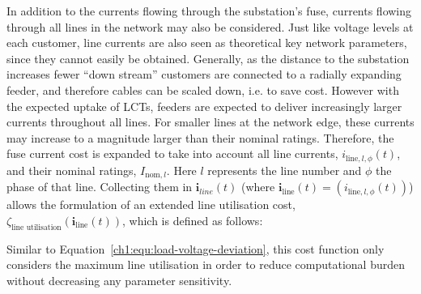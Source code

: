In addition to the currents flowing through the substation's fuse, currents flowing through all lines in the network may also be considered.
Just like voltage levels at each customer, line currents are also seen as theoretical key network parameters, since they cannot easily be obtained.
Generally, as the distance to the substation increases fewer ``down stream'' customers are connected to a radially expanding feeder, and therefore cables can be scaled down, i.e. to save cost.
However with the expected uptake of LCTs, feeders are expected to deliver increasingly larger currents throughout all lines.
For smaller lines at the network edge, these currents may increase to a magnitude larger than their nominal ratings.
Therefore, the fuse current cost is expanded to take into account all line currents, $i_{\text{line},l,\phi}(t)$, and their nominal ratings, $I_{\text{nom}, l}$.
Here $l$ represents the line number and $\phi$ the phase of that line.
Collecting them in $\textbf{i}_{line}(t)$ (where $\textbf{i}_\text{line}(t) = (i_{\text{line},l,\phi}(t))$) allows the formulation of an extended line utilisation cost, $\zeta_\text{line utilisation}(\textbf{i}_\text{line}(t))$, which is defined as follows:



Similar to Equation~\ref{ch1:equ:load-voltage-deviation}, this cost function only considers the maximum line utilisation in order to reduce computational burden without decreasing any parameter sensitivity.
